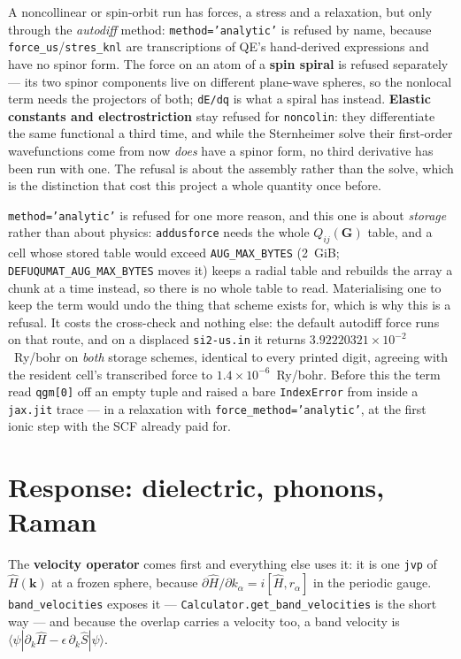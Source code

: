 \documentclass[11pt,a4paper]{article}
\newcommand{\code}[1]{\texttt{\small #1}}
\begin{document}
\begin{refuses}
A noncollinear or spin-orbit run has forces, a stress and a relaxation, but only
through the \emph{autodiff} method: \code{method='analytic'} is refused by name,
because \code{force\_us}/\code{stres\_knl} are transcriptions of QE's
hand-derived expressions and have no spinor form. The force on an atom of a
\textbf{spin spiral} is refused separately --- its two spinor components live on
different plane-wave spheres, so the nonlocal term needs the projectors of both;
\code{dE/dq} is what a spiral has instead. \textbf{Elastic constants and
electrostriction} stay refused for \code{noncolin}: they differentiate the same
functional a third time, and while the Sternheimer solve their first-order
wavefunctions come from now \emph{does} have a spinor form, no third derivative
has been run with one. The refusal is about the assembly rather than the solve,
which is the distinction that cost this project a whole quantity once before.

\code{method='analytic'} is refused for one more reason, and this one is about
\emph{storage} rather than about physics: \code{addusforce} needs the whole
$Q_{ij}(\mathbf G)$ table, and a cell whose stored table would exceed
\code{AUG\_MAX\_BYTES} (2~GiB; \code{DEFUQUMAT\_AUG\_MAX\_BYTES} moves it)
keeps a radial table and rebuilds the array a chunk at a time instead, so there
is no whole table to read. Materialising one to keep the term would undo the
thing that scheme exists for, which is why this is a refusal. It costs the
cross-check and nothing else: the default autodiff force runs on that route, and
on a displaced \code{si2-us.in} it returns $3.92220321\times10^{-2}$~Ry/bohr on
\emph{both} storage schemes, identical to every printed digit, agreeing with the
resident cell's transcribed force to $1.4\times10^{-6}$~Ry/bohr. Before this the
term read \code{qgm[0]} off an empty tuple and raised a bare \code{IndexError}
from inside a \code{jax.jit} trace --- in a relaxation with
\code{force\_method='analytic'}, at the first ionic step with the SCF already
paid for.
\end{refuses}

\section{Response: dielectric, phonons, Raman}

The \textbf{velocity operator} comes first and everything else uses it: it is one
\code{jvp} of $\hat H(\mathbf k)$ at a frozen sphere, because
$\partial\hat H/\partial k_\alpha = i[\hat H, r_\alpha]$ in the periodic gauge.
\code{band\_velocities} exposes it --- \code{Calculator.get\_band\_velocities}
is the short way --- and because the overlap carries a velocity too, a band
velocity is
$\langle\psi|\partial_k\hat H - \epsilon\,\partial_k\hat S|\psi\rangle$.
\end{document}
